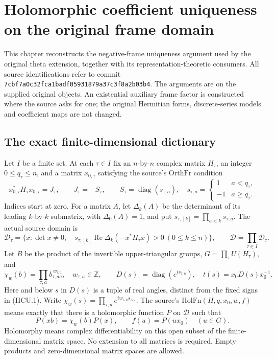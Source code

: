 \section{Holomorphic coefficient uniqueness on the original frame domain}
\label{sec:holomorphic-uniqueness}

This chapter reconstructs the negative-frame uniqueness argument used by
the original theta extension, together with its representation-theoretic
consumers.  All source identifications refer to commit
\texttt{7cbf7a0c32fca1badf05931879a37c3f8a2b03b4}.
The arguments are on the supplied original objects.  An existential
auxiliary frame factor is constructed where the source asks for one;
the original Hermitian forms, discrete-series models and coefficient
maps are not changed.

\subsection*{The exact finite-dimensional dictionary}

Let \(I\) be a finite set.  At each \(\tau\in I\) fix an \(n\)-by-\(n\)
complex matrix \(H_\tau\), an integer \(0\le q_\tau\le n\), and a matrix
\(x_{0,\tau}\) satisfying the source's \(\mathrm{OrthFr}\) condition
\[
 x_{0,\tau}^{*}H_\tau x_{0,\tau}=J_\tau,\qquad
 J_\tau=-S_\tau,\qquad
 S_\tau=\operatorname{diag}(s_{\tau,a}),\quad
 s_{\tau,a}=
 \begin{cases}1&a<q_\tau,\\-1&a\ge q_\tau.\end{cases}
 \tag{HCU.1}
\]
Indices start at zero.  For a matrix \(A\), let \(\Delta_k(A)\) be the
determinant of its leading \(k\)-by-\(k\) submatrix, with
\(\Delta_0(A)=1\), and put
\(s_{\tau,[k]}=\prod_{a<k}s_{\tau,a}\).
The actual source domain is
\[
 \mathcal D_\tau=\{x:\det x\ne0,\quad
 s_{\tau,[k]}\operatorname{Re}\Delta_k(-x^*H_\tau x)>0
 \ (0\le k\le n)\},\qquad
 \mathcal D=\prod_{\tau\in I}\mathcal D_\tau .
 \tag{HCU.2}
\]
Let \(B\) be the product of the invertible upper-triangular groups,
\(G=\prod_\tau U(H_\tau)\), and
\[
 \chi_w(b)=\prod_{\tau,a}b_{\tau,aa}^{\,w_{\tau,a}},
 \quad w_{\tau,a}\in\mathbb Z,\qquad
 D(s)_\tau=\operatorname{diag}(e^{is_{\tau,a}}),\quad
 t(s)=x_0D(s)x_0^{-1}.
 \tag{HCU.3}
\]
Here and below \(s\) in \(D(s)\) is a tuple of real angles, distinct from
the fixed signs in (HCU.1).  Write
\(\chi_w(s)=\prod_{\tau,a}e^{iw_{\tau,a}s_{\tau,a}}\).
The source's \(\mathrm{HolFn}(H,q,x_0,w,f)\) means exactly that there
is a holomorphic function \(P\) on \(\mathcal D\) such that
\[
 P(xb)=\chi_w(b)P(x),\qquad f(u)=P(ux_0)\quad(u\in G).
 \tag{HCU.4}
\]
Holomorphy means complex differentiability on this open subset of the
finite-dimensional matrix space.  No extension to all matrices is
required.  Empty products and zero-dimensional matrix spaces are allowed.

